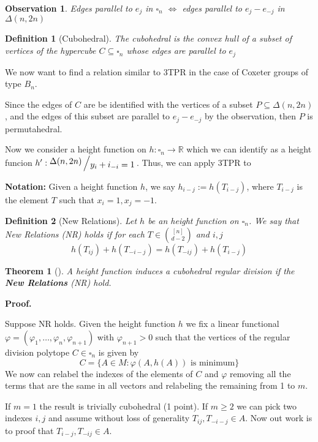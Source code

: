 \documentclass{myclass}
\newtheorem*{definition}{Definition}
\newtheorem*{theorem}{Theorem}
\newtheorem*{observation}{Observation}
\newcommand{\bigslant}[2]{{\raisebox{.2em}{$#1$}\left/\raisebox{-.2em}{$#2$}\right.}}
\begin{document}
\begin{observation}
  \label{obs1}
  Edges parallel to $e_j$ in  $\square_n$ $\iff$ edges parallel to $e_j-e_{-j}$ in $\Delta(n, 2n)$
\end{observation}

\begin{definition}[Cubohedral]
The cubohedral is the convex hull of a subset of vertices of the hypercube $C\subseteq \square_n$ whose edges are parallel to $e_j$
\end{definition}

We now want to find a relation similar to 3TPR in the case of  Coxeter groups of type $B_n$.

Since the edges of $C$ are be identified with the vertices of a subset $P\subseteq \Delta(n, 2n)$, and the edges of this subset are parallel to $e_j-e_{-j}$ by the observation, then $P$ is permutahedral.

Now we consider a height function on $h:\square_n \to \mathbb{R}$ which we can identify as a height funcion $h': \bigslant{\Delta(n, 2n)}{y_i+i_{-i} = 1}$. Thus, we can apply 3TPR to 

\textbf{Notation:} Given a height function $h$, we say $h_{i-j}:=h(T_{i-j})$, where $T_{i-j}$ is the element $T$ such that $x_i = 1, x_j = -1$.

\begin{definition}[New Relations] Let $h$ be an height function on $\square_n$.
We say that New Relations (NR) holds if for each $T\in \binom{[n]}{d-2}$ and $i, j$
\[
h(T_{ij})+ h(T_{-i-j}) = h(T_{-ij}) + h(T_{i-j})
\] 
\end{definition}
\begin{theorem}[] A height function induces a cubohedral regular division if the \textbf{New Relations} (NR) hold.
\end{theorem}

\textbf{Proof.}

Suppose NR holds. Given the height function $h$ we fix a linear functional  $\varphi = (\varphi _1, \ldots, \varphi _n, \varphi _{n+1})$ with $\varphi _{n+1}>0$ such that the vertices of the regular division polytope $C\in \square_n$ is given by
\[
C = \{A \in M: \varphi (A, h(A)) \text{ is minimum}\}
\] 
We now can relabel the indexes of the elements of $C$ and $\varphi $ removing all the terms that are the same in all vectors and relabeling the remaining from 1 to $m$.

If  $m = 1$ the result is trivially cubohedral (1 point). If  $m\ge 2$ we can pick two indexes $i, j$ and assume without loss of generality  $T_{ij}, T_{-i-j}\in A$. Now out work is to proof that $T_{i-j}, T_{-ij} \in A$.
\end{document}
